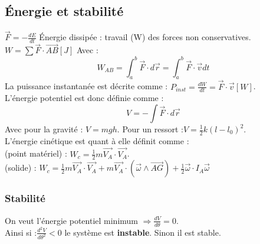 \documentclass[../main.tex]{subfiles}
\begin{document}
\subsection{Énergie et stabilité}
$\vec{F} = -\frac{dE}{dt}$ Énergie dissipée : travail (W) des forces non conservatives.\\
$W = \sum \vec{F} \cdot \vec{AB} [J]$ Avec : \\
\begin{equation}
    W_{AB} = \int_a^b \vec{F} \cdot d\vec{r} = \int_a^b \vec{F} \cdot \vec{v} dt
\end{equation}
La puissance instantanée est décrite comme : $P_{inst} = \frac{dW}{dt} = \vec{F} \cdot \vec{v}[W]$. \\
L'énergie potentiel est donc définie comme : \\
\begin{equation}
    V = -\int \vec{F}\cdot d\vec{r}
\end{equation}
Avec pour la gravité : $V = mgh$. Pour un ressort :$V = \frac{1}{2} k(l-l_0)^2$.\\
L'énergie cinétique est quant à elle définit comme :\\
(point matériel) : $W_c = \frac{1}{2} m \vec{V_A} \cdot \vec{V_A}$. \\
(solide) : $W_c = \frac{1}{2} m \vec{V_A} \cdot \vec{V_A} + m \vec{V_A} \cdot (\vec{\omega} \wedge \vec{AG}) + \frac{1}{2} \vec{\omega} \cdot I_A \vec{\omega}$\\


\subsubsection{Stabilité}
On veut l'énergie potentiel minimum $\Rightarrow \frac{d V}{d \theta} = 0$.\\
Ainsi si :$\frac{d^2V}{d \theta^2} < 0$ le système est \textbf{instable}. Sinon il est stable.
\end{document}
